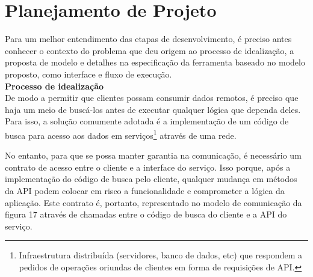 \section{Planejamento de Projeto}

Para um melhor entendimento das etapas de desenvolvimento, é preciso antes conhecer o contexto do problema que deu origem ao processo de idealização, a proposta de modelo e detalhes na especificação da ferramenta baseado no modelo proposto, como interface e fluxo de execução. \\

\textbf{Processo de idealização} \\

De modo a permitir que clientes possam consumir dados remotos, é preciso que haja um meio de buscá-los antes de executar qualquer lógica que dependa deles. Para isso, a solução comumente adotada é a implementação de um código de busca para acesso aos dados em serviços\footnote{
  Infraestrutura distribuída (servidores, banco de dados, etc) que respondem a pedidos de operações oriundas de clientes em forma de requisições de API.
} através de uma rede.

No entanto, para que se possa manter garantia na comunicação, é necessário um contrato de acesso entre o cliente e a interface do serviço. Isso porque, após a implementação do código de busca pelo cliente, qualquer mudança em métodos da API podem colocar em risco a funcionalidade e comprometer a lógica da aplicação. Este contrato é, portanto, representado no modelo de comunicação da figura 17 através de chamadas entre o código de busca do cliente e a API do serviço.

